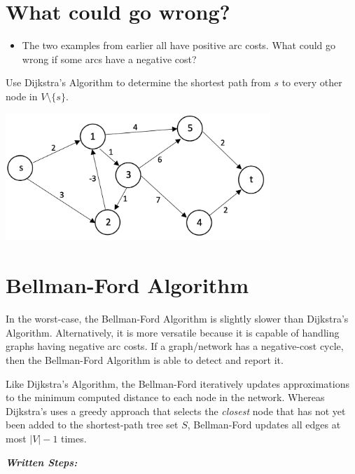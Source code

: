 \documentclass[12pt]{article}
\theoremstyle{definition}
\begin{document}
\vfill

\newpage

\section{What could go wrong?}

\begin{itemize}

\item The two examples from earlier all have positive arc costs. What could go wrong if some arcs have a negative cost?

\end{itemize}
\vfill
 
Use Dijkstra's Algorithm to determine the shortest path from $s$ to every other node in $V \setminus \{s\}$.

\begin{center}
\includegraphics[width=10cm]{shortestpathnegativecycles}
\end{center}

\vfill


\newpage
\section{Bellman-Ford Algorithm}


In the worst-case, the Bellman-Ford Algorithm is slightly slower than Dijkstra's Algorithm. Alternatively, it is more versatile because it is capable of handling graphs having negative arc costs. If a graph/network has a negative-cost cycle, then the Bellman-Ford Algorithm is able to detect and report it.

Like Dijkstra's Algorithm, the Bellman-Ford iteratively updates approximations to the minimum computed distance to each node in the network. Whereas Dijkstra's uses a greedy approach that selects the \emph{closest} node that has not yet been added to the shortest-path tree set $S$, Bellman-Ford updates all edges at most $|V| - 1$ times. 

\emph{\textbf{Written Steps:}}
\end{document}
